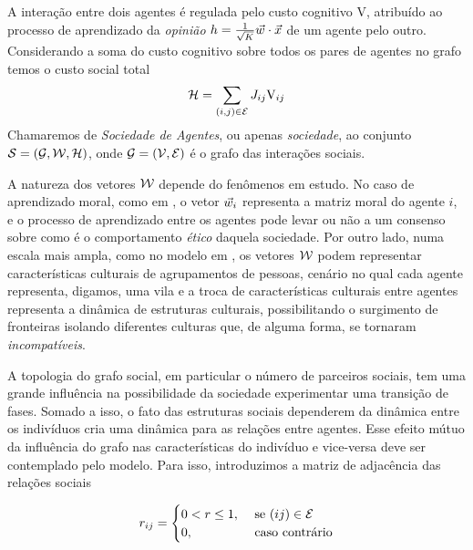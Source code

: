 \newcommand{\cogcost}{\ensuremath{{\mathrm{V}}}}
\newcommand{\opn}[2]{\ensuremath{{1\over \sqrt{K}} \agt{#1} \cdot
    \vec{#2}}} \newcommand{\cost}{\ensuremath{{\mathcal{H}}}}
\newcommand{\SG}{\ensuremath{\mathcal{G}}}
\newcommand{\soc}{\ensuremath{\mathcal{S}}} A interação entre dois
agentes é regulada pelo custo cognitivo $\cogcost$, atribuído ao
processo de aprendizado da \emph{opinião} $h = \opn{ }{x}$ de um
agente pelo outro.  Considerando a soma do custo cognitivo sobre todos
os pares de agentes no grafo temos o custo social total
\begin{align}
  \cost = \sum_{(i,j)\in \edg} J_{ij} \cogcost_{ij} \label{eq:Scost}
\end{align}
Chamaremos de \emph{Sociedade de
  Agentes}, ou apenas \emph{sociedade}, ao conjunto $\soc = (\SG, \MM,
\cost)$, onde $\SG = (\vrt,\edg)$ é o grafo das interações sociais.

A natureza dos vetores $\mathcal{W}$ depende do fenômenos em estudo. No caso
de aprendizado moral, como em \parencite{Cesar2014}, o vetor $\vec{w}_{i}$
representa a matriz moral do agente $i$, e o processo de aprendizado
entre os agentes pode levar ou não a um consenso sobre como é o
comportamento \emph{ético} daquela sociedade. Por outro lado, numa
escala mais ampla, como no modelo em \parencite{Axelrod1997}, os
vetores $\mathcal{W}$ podem representar características culturais de
agrupamentos de pessoas, cenário no qual cada agente representa,
digamos, uma vila e a troca de características culturais entre agentes
representa a dinâmica de estruturas culturais, possibilitando o
surgimento de fronteiras isolando diferentes culturas que, de alguma
forma, se tornaram \emph{incompatíveis}.

A topologia do grafo social, em particular o número de parceiros
sociais, tem uma grande influência na possibilidade da sociedade
experimentar uma transição de fases.  Somado a isso, o fato das
estruturas sociais dependerem da dinâmica entre os indivíduos cria uma
dinâmica para as relações entre agentes.  Esse efeito mútuo da
influência do grafo nas características do indivíduo e vice-versa deve
ser contemplado pelo modelo. Para isso, introduzimos a matriz de
adjacência das relações sociais

\begin{equation}
 r_{ij} =
  \begin{cases}
    0 < r \leq 1, & \text{ se } (ij) \in \mathcal{E} \\
    0, & \text{ caso contrário}
  \end{cases}
\end{equation}

